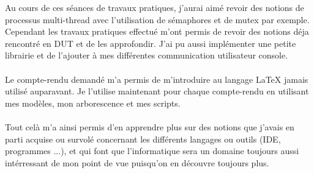\documentclass[12pt,a4paper]{book} %
\begin{document}
Au cours de ces séances de travaux pratiques, j'aurai aimé revoir des notions de processus multi-thread avec l'utilisation de sémaphores et de mutex par exemple.\\
Cependant les travaux pratiques effectué m'ont permis de revoir des notions déja rencontré en DUT et de les approfondir.
J'ai pu aussi implémenter une petite librairie et de l'ajouter à mes différentes communication utilisateur console.
\\\\
Le compte-rendu demandé m'a permis de m'introduire au langage LaTeX jamais utilisé auparavant. Je l'utilise maintenant pour chaque compte-rendu en utilisant mes modèles, mon arborescence et mes scripts.
\\\\
Tout celà m'a ainsi permis d'en apprendre plus sur des notions que j'avais en parti acquise ou survolé concernant les différents langages ou outils (IDE, programmes ...), et qui font que l'informatique sera un domaine toujours aussi intérressant de mon point de vue puisqu'on en découvre toujours plus.

\pagestyle{fancy}

\end{document}

